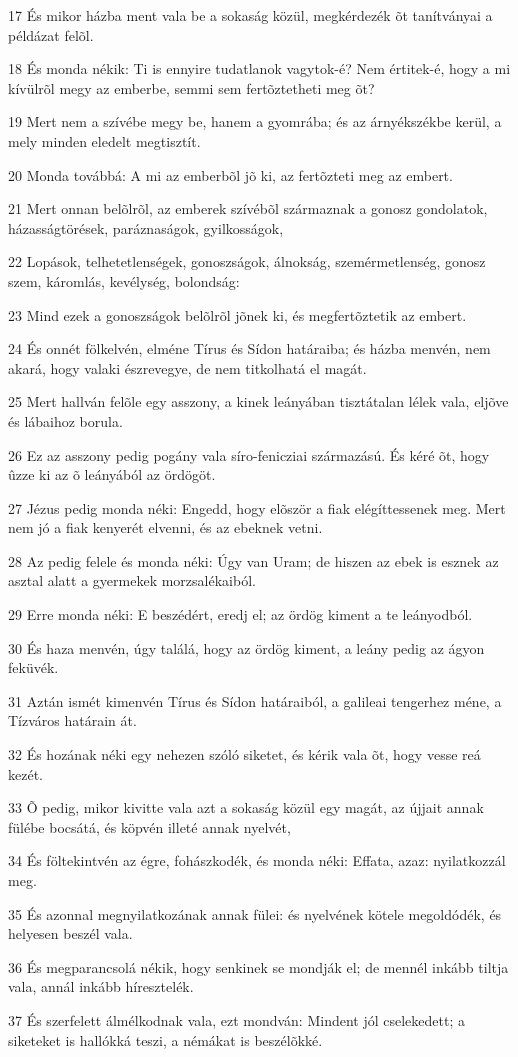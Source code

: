 \par 17 És mikor házba ment vala be a sokaság közül, megkérdezék õt tanítványai a példázat felõl.
\par 18 És monda nékik: Ti is ennyire tudatlanok vagytok-é? Nem értitek-é, hogy a mi kívülrõl megy az emberbe, semmi sem fertõztetheti meg õt?
\par 19 Mert nem a szívébe megy be, hanem a gyomrába; és az árnyékszékbe kerül, a mely minden eledelt megtisztít.
\par 20 Monda továbbá: A mi az emberbõl jõ ki, az fertõzteti meg az embert.
\par 21 Mert onnan belõlrõl, az emberek szívébõl származnak a gonosz gondolatok, házasságtörések, paráznaságok, gyilkosságok,
\par 22 Lopások, telhetetlenségek, gonoszságok, álnokság, szemérmetlenség, gonosz szem, káromlás, kevélység, bolondság:
\par 23 Mind ezek a gonoszságok belõlrõl jõnek ki, és megfertõztetik az embert.
\par 24 És onnét fölkelvén, elméne Tírus és Sídon határaiba; és házba menvén, nem akará, hogy valaki észrevegye, de nem titkolhatá el magát.
\par 25 Mert hallván felõle egy asszony, a kinek leányában tisztátalan lélek vala, eljõve és lábaihoz borula.
\par 26 Ez az asszony pedig pogány vala síro-fenicziai származású. És kéré õt, hogy ûzze ki az õ leányából az ördögöt.
\par 27 Jézus pedig monda néki: Engedd, hogy elõször a fiak elégíttessenek meg. Mert nem jó a fiak kenyerét elvenni, és az ebeknek vetni.
\par 28 Az pedig felele és monda néki: Úgy van Uram; de hiszen az ebek is esznek az asztal alatt a gyermekek morzsalékaiból.
\par 29 Erre monda néki: E beszédért, eredj el; az ördög kiment a te leányodból.
\par 30 És haza menvén, úgy találá, hogy az ördög kiment, a leány pedig az ágyon feküvék.
\par 31 Aztán ismét kimenvén Tírus és Sídon határaiból, a galileai tengerhez méne, a Tízváros határain át.
\par 32 És hozának néki egy nehezen szóló siketet, és kérik vala õt, hogy vesse reá kezét.
\par 33 Õ pedig, mikor kivitte vala azt a sokaság közül egy magát, az újjait annak fülébe bocsátá, és köpvén illeté annak nyelvét,
\par 34 És föltekintvén az égre, fohászkodék, és monda néki: Effata, azaz: nyilatkozzál meg.
\par 35 És azonnal megnyilatkozának annak fülei: és nyelvének kötele megoldódék, és helyesen beszél vala.
\par 36 És megparancsolá nékik, hogy senkinek se mondják el; de mennél inkább tiltja vala, annál inkább híresztelék.
\par 37 És szerfelett álmélkodnak vala, ezt mondván: Mindent jól cselekedett; a siketeket is hallókká teszi, a némákat is beszélõkké.

